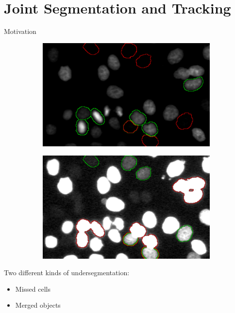 \section{Joint Segmentation and Tracking}

\begin{frame}{Motivation}
    \begin{figure}
    \centering
    \begin{subfigure}[t]{0.48\textwidth}
        \includegraphics[width=\textwidth]{images/joint/mitocheck_255_max.pdf}
        \caption{}
        \label{fig:joint-underseg-no-detection}
    \end{subfigure}
    \hfill
    \begin{subfigure}[t]{0.48\textwidth}
        \includegraphics[width=\textwidth]{images/joint/mitocheck_030_max.pdf}
        \caption{}
        \label{fig:joint-underseg-mergers}
    \end{subfigure}
\end{figure}
Two different kinds of undersegmentation:
\begin{itemize}
      \item Missed cells
      \item Merged objects
\end{itemize}


\end{frame}

